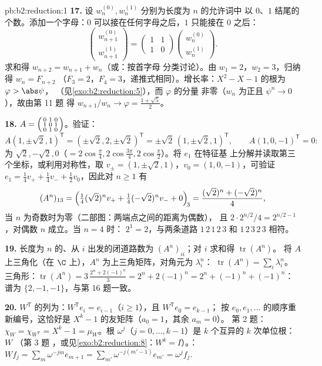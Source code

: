 \begin{solution}{pb:b2:reduction:1}
\textbf{17.} 设 $w_n^{(0)}, w_n^{(1)}$ 分别为长度为 $n$ 的允许词中
以 $0$、$1$ 结尾的个数。添加一个字母：$0$
可以接在任何字母之后，$1$ 只能接在 $0$ 之后：
\[
\begin{pmatrix} w_{n+1}^{(0)}\\ w_{n+1}^{(1)}\end{pmatrix}
= \begin{pmatrix} 1 & 1\\ 1 & 0\end{pmatrix}
\begin{pmatrix} w_n^{(0)}\\ w_n^{(1)}\end{pmatrix}.
\]
求和得 $w_{n+2} = w_{n+1} + w_n$（或：按首字母
分类讨论）。由 $w_1 = 2$，$w_2 = 3$，归纳得 $w_n = F_{n+2}$
（$F_3 = 2$，$F_4 = 3$，递推式相同）。增长率：$X^2 - X - 1$ 的根为
$\varphi > \abs\psi$，
（见\cref{exo:b2:reduction:5}），而 $\varphi$ 的分量
非零（$w_n$ 为正且 $\psi^n \to 0$），故由第 11 题
得 $w_{n+1}/w_n \to \varphi = \frac{1 + \sqrt5}2$。

\textbf{18.} $A = \begin{psmallmatrix} 0&1&0\\ 1&0&1\\
0&1&0\end{psmallmatrix}$。验证：
\[
A(1, \pm\sqrt2, 1)^{\mathsf T}
= (\pm\sqrt2, 2, \pm\sqrt2)^{\mathsf T}
= \pm\sqrt2\,(1, \pm\sqrt2, 1)^{\mathsf T},
\qquad
A(1, 0, -1)^{\mathsf T} = 0 :
\]
为 $\sqrt2, -\sqrt2, 0$（$= 2\cos\frac\pi4,
2\cos\frac{3\pi}4, 2\cos\frac\pi2$）。将 $e_1$ 在特征基
上分解并读取第三个坐标，或利用对称性，取
$v_\pm = (1, \pm\sqrt2, 1)$，$v_0 = (1, 0, -1)$，可验证 $e_1
= \frac14 v_+ + \frac14 v_- + \frac12 v_0$，因此对 $n \geq 1$ 有
\[
(A^n)_{13} = \Bigl(\tfrac14(\sqrt2)^n v_+ +
\tfrac14(-\sqrt2)^n v_- + 0\Bigr)_{\!3}
= \frac{(\sqrt2)^n + (-\sqrt2)^n}{4},
\]
当 $n$ 为奇数时为零（二部图：两端点之间的距离为偶数），
且 $2\cdot 2^{n/2}/4 = 2^{n/2 - 1}$，对偶数 $n$ 成立。当 $n = 4$ 时：
$2^{1} = 2$，与两条道路 $1\,2\,1\,2\,3$ 和
$1\,2\,3\,2\,3$ 相符。

\textbf{19.} 长度为 $n$ 的、从 $i$ 出发的闭道路数为
$(A^n)_{ii}$；对 $i$ 求和得 $\operatorname{tr}(A^n)$。
将 $A$ 上三角化（在 $\C$ 上），$A^n$ 为上三角矩阵，对角元为 $\lambda_i^n$：
$\operatorname{tr}(A^n) = \sum_i\lambda_i^n$。
三角形：$\operatorname{tr}(A^n) = 3\,\frac{2^n + 2(-1)^n}3 =
2^n + 2(-1)^n = 2^n + (-1)^n + (-1)^n$：谱为 $\{2, -1,
-1\}$，与第 16 题一致。

\textbf{20.} $W^{\mathsf T}$ 的列为：$W^{\mathsf T}e_i =
e_{i-1}$（$i \geq 1$），且 $W^{\mathsf T}e_0 = e_{k-1}$；
按 $e_0, e_1, \dots$ 的顺序重新编号，这恰好是
$X^k - 1$ 的友矩阵（$a_0 = 1$，其余 $a_m = 0$）。
第 2 题：$\chi_{W} = \chi_{W^{\mathsf T}} = X^k - 1 =
\mu_{W}$。根 $\omega^j$（$j = 0, \dots, k-1$）是 $k$
个互异的 $k$ 次单位根：$W$ （第 3 题
，或见\cref{exo:b2:reduction:8}：$W^k = I$）。：$Wf_j
= \sum_m \omega^{-jm}e_{m+1} = \sum_{m'}\omega^{-j(m'-1)}e_{m'}
= \omega^j f_j$.


\end{solution}
